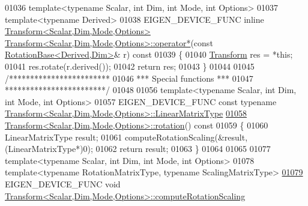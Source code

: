 \begin{DoxyCode}
01036 \textcolor{keyword}{template}<\textcolor{keyword}{typename} Scalar, \textcolor{keywordtype}{int} Dim, \textcolor{keywordtype}{int} Mode, \textcolor{keywordtype}{int} Options>
01037 \textcolor{keyword}{template}<\textcolor{keyword}{typename} Derived>
01038 EIGEN\_DEVICE\_FUNC \textcolor{keyword}{inline} \hyperlink{group___geometry___module_class_eigen_1_1_transform}{Transform<Scalar,Dim,Mode,Options>} 
      \hyperlink{group___geometry___module_a4e44db730819ead6e555cf325cea3fd6}{Transform<Scalar,Dim,Mode,Options>::operator*}(\textcolor{keyword}{const} 
      \hyperlink{class_eigen_1_1_rotation_base}{RotationBase<Derived,Dim>}& r)\textcolor{keyword}{ const}
01039 \textcolor{keyword}{}\{
01040   \hyperlink{group___geometry___module_class_eigen_1_1_transform}{Transform} res = *\textcolor{keyword}{this};
01041   res.rotate(r.derived());
01042   \textcolor{keywordflow}{return} res;
01043 \}
01044 
01045 \textcolor{comment}{/************************}
01046 \textcolor{comment}{*** Special functions ***}
01047 \textcolor{comment}{************************/}
01048 
01056 \textcolor{keyword}{template}<\textcolor{keyword}{typename} Scalar, \textcolor{keywordtype}{int} Dim, \textcolor{keywordtype}{int} Mode, \textcolor{keywordtype}{int} Options>
01057 EIGEN\_DEVICE\_FUNC \textcolor{keyword}{const} \textcolor{keyword}{typename} 
      \hyperlink{group___core___module_class_eigen_1_1_matrix}{Transform<Scalar,Dim,Mode,Options>::LinearMatrixType}
\hyperlink{group___geometry___module_a87eb429e076e2c15a1bfbe99b43ae07c}{01058} \hyperlink{group___geometry___module_a87eb429e076e2c15a1bfbe99b43ae07c}{Transform<Scalar,Dim,Mode,Options>::rotation}()\textcolor{keyword}{ const}
01059 \textcolor{keyword}{}\{
01060   LinearMatrixType result;
01061   computeRotationScaling(&result, (LinearMatrixType*)0);
01062   \textcolor{keywordflow}{return} result;
01063 \}
01064 
01065 
01077 \textcolor{keyword}{template}<\textcolor{keyword}{typename} Scalar, \textcolor{keywordtype}{int} Dim, \textcolor{keywordtype}{int} Mode, \textcolor{keywordtype}{int} Options>
01078 \textcolor{keyword}{template}<\textcolor{keyword}{typename} RotationMatrixType, \textcolor{keyword}{typename} ScalingMatrixType>
\hyperlink{group___geometry___module_aff2a75622ed0a24dbe4bd22e5aeccb78}{01079} EIGEN\_DEVICE\_FUNC \textcolor{keywordtype}{void} 
      \hyperlink{group___geometry___module_aff2a75622ed0a24dbe4bd22e5aeccb78}{Transform<Scalar,Dim,Mode,Options>::computeRotationScaling}

\end{DoxyCode}
